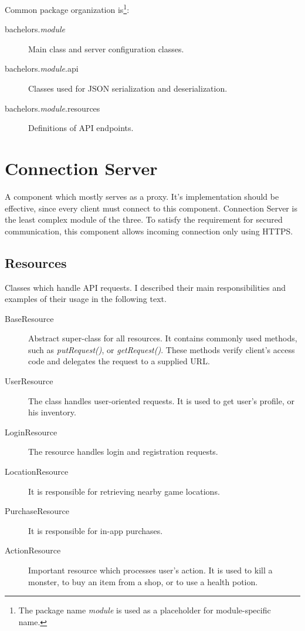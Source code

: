 Common package organization is\footnote{The package name \textit{module} is used as a placeholder for module-specific name.}:
\begin{description}
	\item[bachelors.\textit{module}] Main class and server configuration classes.
	\item[bachelors.\textit{module}.api] Classes used for JSON serialization and deserialization.
	\item[bachelors.\textit{module}.resources] Definitions of API endpoints.
\end{description}

\section{Connection Server}
A component which mostly serves as a proxy. It's implementation should be effective, since every client must connect to this component. Connection Server is the least complex module of the three. To satisfy the requirement for secured communication, this component allows incoming connection only using HTTPS.  

\subsection{Resources}
Classes which handle API requests. I described their main responsibilities and examples of their usage in the following text.

\begin{description}	
	\item[BaseResource] Abstract super-class for all resources. It contains commonly used methods, such as \textit{putRequest()}, or \textit{getRequest()}. These methods verify client's access code and delegates the request to a supplied URL.
	
	\item[UserResource] The class handles user-oriented requests. It is used to get user's profile, or his inventory.
	
	\item[LoginResource] The resource handles login and registration requests.
	
	\item[LocationResource] It is responsible for retrieving nearby game locations.
	
	\item[PurchaseResource] It is responsible for in-app purchases.

	\item[ActionResource] Important resource which processes user's action. It is used to kill a monster, to buy an item from a shop, or to use a health potion.
\end{description}

